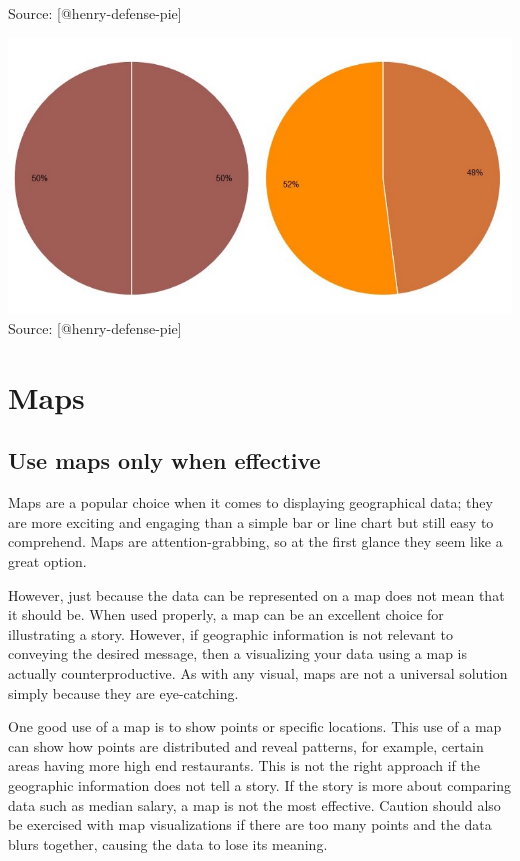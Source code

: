\documentclass[]{book}
\theoremstyle{definition}
\theoremstyle{definition}
\theoremstyle{definition}
\theoremstyle{remark}
\begin{document}
Source: {[}@henry-defense-pie{]}

\includegraphics{images/henry-half.png} Source: {[}@henry-defense-pie{]}

\section{Maps}\label{maps}

\subsection{Use maps only when
effective}\label{use-maps-only-when-effective}

Maps are a popular choice when it comes to displaying geographical data;
they are more exciting and engaging than a simple bar or line chart but
still easy to comprehend. Maps are attention-grabbing, so at the first
glance they seem like a great option.

However, just because the data can be represented on a map does not mean
that it should be. When used properly, a map can be an excellent choice
for illustrating a story. However, if geographic information is not
relevant to conveying the desired message, then a visualizing your data
using a map is actually counterproductive. As with any visual, maps are
not a universal solution simply because they are eye-catching.

One good use of a map is to show points or specific locations. This use
of a map can show how points are distributed and reveal patterns, for
example, certain areas having more high end restaurants. This is not the
right approach if the geographic information does not tell a story. If
the story is more about comparing data such as median salary, a map is
not the most effective. Caution should also be exercised with map
visualizations if there are too many points and the data blurs together,
causing the data to lose its meaning.
\end{document}
